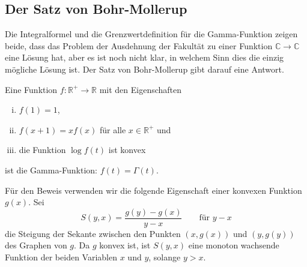%
%
%
\subsection{Der Satz von Bohr-Mollerup
\label{buch:rekursion:subsection:bohr-mollerup}}
Die Integralformel und die Grenzwertdefinition für die Gamma-Funktion
zeigen beide, dass das Problem der Ausdehnung der Fakultät zu einer
Funktion $\mathbb{C}\to\mathbb{C}$ eine Lösung hat, aber es ist noch
nicht klar, in welchem Sinn dies die einzig mögliche Lösung ist.
Der Satz von Bohr-Mollerup gibt darauf eine Antwort.

\begin{satz}
\label{buch:satz:bohr-mollerup}
Eine Funktion $f\colon \mathbb{R}^+\to\mathbb{R}$ mit den Eigenschaften
\begin{enumerate}[i)]
\item $f(1)=1$,
\item $f(x+1)=xf(x)$ für alle $x\in\mathbb{R}^+$ und
\item die Funktion $\log f(t)$ ist konvex
\end{enumerate}
ist die Gamma-Funktion: $f(t)=\Gamma(t)$.
\end{satz}

Für den Beweis verwenden wir die folgende Eigenschaft einer konvexen
Funktion $g(x)$.
Sei
\begin{equation}
S(y,x) = \frac{g(y)-g(x)}{y-x}
\qquad\text{für $y-x$}
\end{equation}
die Steigung der Sekante zwischen den Punkten $(x,g(x))$ und $(y,g(y))$
des Graphen von $g$.
Da $g$ konvex ist, ist $S(y,x)$ eine monoton wachsende Funktion 
der beiden Variablen $x$ und $y$, solange $y>x$.

